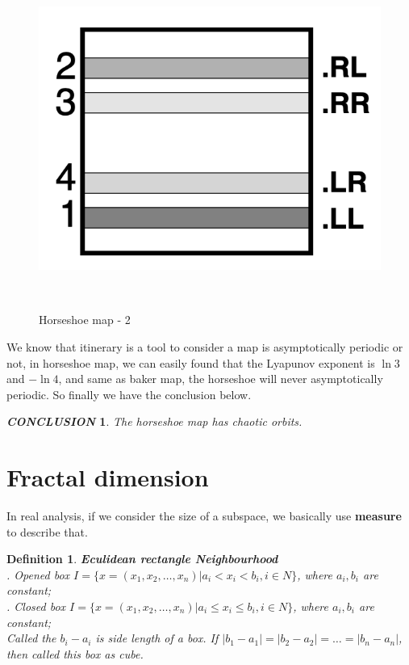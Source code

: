 \documentclass[12pt]{article}
\theoremstyle{plain}
\newtheorem{definition}{{\color{red}\textbf{Definition}}}[section]
\newtheorem{conclusion}{\textit{\textbf{CONCLUSION}}}[section]
\begin{document}
\begin{figure}[H]
\begin{minipage}[c][0.24\width]{
   0.24\textwidth}
\end{minipage}
\begin{minipage}[c][0.24\width]{
   0.24\textwidth}
   \centering
   \includegraphics[width=1\textwidth]{figure/section5/horseshoe-3-2.png}
\end{minipage}
\\[6ex]\caption{Horseshoe map - 2}\label{horseshoe-map-2}
\end{figure}


We know that itinerary is a tool to consider a map is asymptotically periodic or not, in horseshoe map, we can easily found that the Lyapunov exponent is $\ln 3$ and $- \ln 4$, and same as baker map, the horseshoe will never asymptotically periodic. So finally we have the conclusion below.

\begin{conclusion} The horseshoe map has chaotic orbits.
\end{conclusion}






\newpage
\section*{Fractal dimension}

In real analysis, if we consider the size of a subspace, we basically use \textbf{measure} to describe that.

\begin{definition}\textbf{Eculidean rectangle Neighbourhood}
\\. Opened box $I = \{x = (x_1, x_2, \ldots ,x_n) | a_i < x_i < b_i, i \in N\}$, where $a_i, b_i$ are constant;
\\. Closed box $I = \{x = (x_1, x_2, \ldots ,x_n) | a_i \leq x_i \leq b_i, i \in N\}$, where $a_i, b_i$ are constant;
\\\noindent Called the $b_i - a_i$ is side length of a box. If $|b_1 - a_1| = |b_2 - a_2| = \ldots = |b_n - a_n|$, then called this box as cube.
\end{definition}
\end{document}
